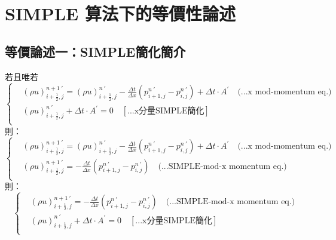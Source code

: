 \documentclass[12pt]{article}
\begin{document}
\section{SIMPLE 算法下的等價性論述}
\label{SIMPLE_equivalence}
\subsection{等價論述一：SIMPLE簡化簡介}
\label{SIMPLE_introduction}
\noindent 若且唯若\\
\begin{equation}
\left\{
\begin{aligned}
    & (\rho u)_{i+\frac{1}{2},j}^{n+1\ \prime} = (\rho u)_{i+\frac{1}{2},j}^{n\ \prime} - \frac{\Delta t}{\Delta x}(p_{i+1,j}^{n\ \prime} - p_{i,j}^{n\ \prime}) + \Delta t \cdot A^{\prime}  \quad \text{(...x mod-momentum eq.)}\\[1.5ex]
    &(\rho u)_{i+\frac{1}{2},j}^{n\ \prime} + \Delta t \cdot A^{\prime} = 0\quad \left[\text{...x分量SIMPLE簡化}\right]\\[1.5ex]
\end{aligned}
\right.
\end{equation}
\noindent 則：\\
\begin{equation}
\left\{
\begin{aligned}
    & (\rho u)_{i+\frac{1}{2},j}^{n+1\ \prime} = (\rho u)_{i+\frac{1}{2},j}^{n\ \prime} - \frac{\Delta t}{\Delta x}(p_{i+1,j}^{n\ \prime} - p_{i,j}^{n\ \prime}) + \Delta t \cdot A^{\prime}  \quad \text{(...x mod-momentum eq.)}\\[1.5ex]
    & (\rho u)_{i+\frac{1}{2},j}^{n+1\ \prime} = - \frac{\Delta t}{\Delta x}(p_{i+1,j}^{n\ \prime} - p_{i,j}^{n\ \prime})  \quad \text{(...SIMPLE-mod-x momentum eq.)}\\[1.5ex]
\end{aligned}
\right.
\end{equation}
\noindent 則：\\
\begin{equation}
\left\{
\begin{aligned}
    &(\rho u)_{i+\frac{1}{2},j}^{n+1\ \prime} = - \frac{\Delta t}{\Delta x}(p_{i+1,j}^{n\ \prime} - p_{i,j}^{n\ \prime})  \quad \text{(...SIMPLE-mod-x momentum eq.)}\\[1.5ex]
    &(\rho u)_{i+\frac{1}{2},j}^{n\ \prime} + \Delta t \cdot A^{\prime} = 0\quad \left[\text{...x分量SIMPLE簡化}\right]\\[1.5ex]
\end{aligned}
\right.
\end{equation}
\end{document}
